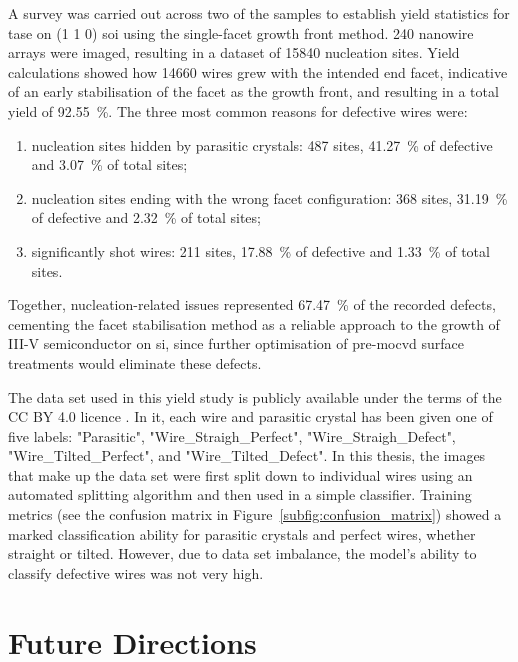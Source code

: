 A survey was carried out across two of the samples to establish yield statistics for \acs{tase} on \hkl(1 1 0) \acs{soi} using the single-facet  growth front method. \num{240} nanowire arrays were imaged, resulting in a dataset of \num{15840} nucleation sites. Yield calculations showed how \num{14660} wires grew with the intended end facet, indicative of an early stabilisation of the  facet as the growth front, and resulting in a total yield of \qty{92.55}{\%}. The three most common reasons for defective wires were:

\begin{enumerate}
    \item nucleation sites hidden by parasitic crystals: \num{487} sites, \qty{41.27}{\percent} of defective and \qty{3.07}{\percent} of total sites;
    \item nucleation sites ending with the wrong facet configuration: \num{368} sites, \qty{31.19}{\percent} of defective and \qty{2.32}{\percent} of total sites;
    \item significantly shot wires: \num{211} sites, \qty{17.88}{\percent} of defective and \qty{1.33}{\percent} of total sites.
\end{enumerate}

Together, nucleation-related issues represented \qty{67.47}{\percent} of the recorded defects, cementing the facet stabilisation method as a reliable approach to the growth of III-V semiconductor on \acl{si}, since further optimisation of pre-\acs{mocvd} surface treatments would eliminate these defects.

The data set used in this yield study is publicly available \cite{dataset} under the terms of the CC BY 4.0 licence \cite{CCBY40}. In it, each wire and parasitic crystal has been given one of five labels: "Parasitic", "Wire\_Straigh\_Perfect", "Wire\_Straigh\_Defect", "Wire\_Tilted\_Perfect", and "Wire\_Tilted\_Defect". In this thesis, the images that make up the data set were first split down to individual wires using an automated splitting algorithm \cite{code} and then used in a simple classifier. Training metrics (see the confusion matrix in Figure~\ref{subfig:confusion_matrix}) showed a marked classification ability for parasitic crystals and perfect wires, whether straight or tilted. However, due to data set imbalance, the model's ability to classify defective wires was not very high.

\section{Future Directions}

